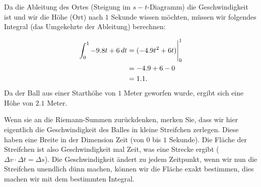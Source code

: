 \begin{solution}
Da die Ableitung des Ortes (Steigung im $s-t$-Diagramm) die Geschwindigkeit ist und wir die Höhe (Ort) nach $1$ Sekunde wissen möchten, müssen wir folgendes Integral (das Umgekehrte der Ableitung) berechnen:

\begin{align*}
\int_0^1 -9.8t + 6 \, d t &= (-4.9t^2 + 6t)\Bigg|_0^1\\
&= -4.9 + 6 - 0\\
&= 1.1.
\end{align*}
Da der Ball aus einer Starthöhe von $1$ Meter geworfen wurde, ergibt sich eine Höhe von $2.1$ Meter.
\end{solution}

Wenn sie an die Riemann-Summen zurückdenken, merken Sie, dass wir hier eigentlich die Geschwindigkeit des Balles in kleine Streifchen zerlegen. Diese haben eine Breite in der Dimension Zeit (von $0$ bis $1$ Sekunde). Die Fläche der Streifchen ist also Geschwindigkeit mal Zeit, was eine Strecke ergibt ($\Delta v \cdot \Delta t = \Delta s$). Die Geschwindigkeit ändert zu jedem Zeitpunkt, wenn wir nun die Streifchen unendlich dünn machen, können wir die Fläche exakt bestimmen, dies machen wir mit dem bestimmten Integral.














